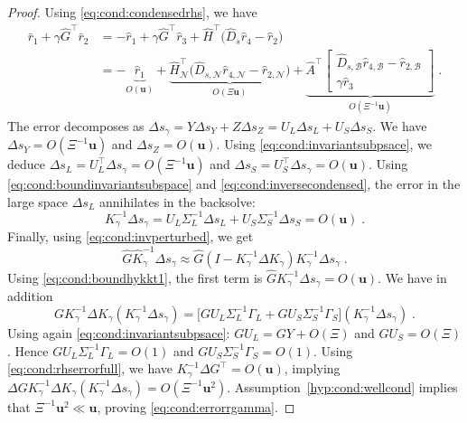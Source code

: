 \documentclass[10pt,a4paper]{amsart}
\newcommand{\cactive}{\mathcal{B}}
\newcommand{\cinactive}{\mathcal{N}}
\newcommand{\epstol}{\mathbf{u}}
\begin{document}
\begin{proof}
Using \eqref{eq:cond:condensedrhs}, we have
\begin{equation*}
  \label{eq:cond:boundderivationhykkt}
  \begin{aligned}
  \bar{r}_1 + \gamma \widehat{G}^\top \bar{r}_2 &=
- \widehat{r}_1 + \gamma \widehat{G}^\top \widehat{r}_3+ \widehat{H}^\top\big(\widehat{D}_{s} \widehat{r}_{4} - \widehat{r}_{2} \big) \\
&=  -
\underbrace{\widehat{r}_1}_{O(\epstol)} +
\underbrace{
\widehat{H}_{\cinactive}^\top\big(\widehat{D}_{s,\cinactive} \widehat{r}_{4,\cinactive} - \widehat{r}_{2,\cinactive} \big)}_{O(\Xi \epstol)}
+ \underbrace{\widehat{A}^\top \begin{bmatrix}
  \widehat{D}_{s,\cactive} \widehat{r}_{4,\cactive} - \widehat{r}_{2,\cactive}  \\
  \gamma \widehat{r}_3
\end{bmatrix}}_{O(\Xi^{-1}\epstol)} \; .
  \end{aligned}
\end{equation*}
The error decomposes as $\Delta s_\gamma = Y \Delta s_Y  + Z \Delta s_Z
= U_L \Delta s_L + U_S \Delta s_S$.
We have $\Delta s_Y = O(\Xi^{-1} \epstol)$ and $\Delta s_Z = O(\epstol)$.
Using \eqref{eq:cond:invariantsubpsace}, we deduce
$\Delta s_L = U_L^\top \Delta s_\gamma = O(\Xi^{-1} \epstol)$ and
$\Delta s_S = U_S^\top \Delta s_\gamma = O(\epstol)$.
Using \eqref{eq:cond:boundinvariantsubspace} and \eqref{eq:cond:inversecondensed},
the error in the large space $\Delta s_L$ annihilates in the backsolve:
\begin{equation}
  \label{eq:cond:boundhykkt1}
  K_\gamma^{-1} \Delta s_\gamma = U_L \Sigma_L^{-1} \Delta s_L + U_S \Sigma_S^{-1} \Delta s_S  = O(\epstol)
  \; .
\end{equation}
Finally, using \eqref{eq:cond:invperturbed}, we get
\begin{equation}
  \widehat{G} \widehat{K}_\gamma^{-1} \Delta s_\gamma \approx
  \widehat{G} (I - K_\gamma^{-1}\Delta K_\gamma) K_\gamma^{-1} \Delta s_\gamma \; .
\end{equation}
Using \eqref{eq:cond:boundhykkt1}, the first term is $\widehat{G} K_\gamma^{-1} \Delta s_\gamma = O(\epstol)$.
We have in addition
\begin{equation}
  G K_\gamma^{-1}\Delta K_\gamma (K_\gamma^{-1} \Delta s_\gamma)  =
  \big[ G U_L \Sigma_L^{-1} \Gamma_L + G U_S \Sigma_S^{-1} \Gamma_S \big] (K_\gamma^{-1} \Delta s_\gamma) \; .
\end{equation}
Using again \eqref{eq:cond:invariantsubpsace}:
$G U_L = G Y + O(\Xi)$ and $G U_S = O(\Xi)$. Hence
$G U_L \Sigma_L^{-1} \Gamma_L = O(1)$ and $G U_S \Sigma_S^{-1} \Gamma_S = O(1)$.
Using \eqref{eq:cond:rhserrorfull}, we have $K_\gamma^{-1} \Delta G^\top = O(\epstol)$,
implying $\Delta G K_\gamma^{-1} \Delta K_\gamma (K_\gamma^{-1} \Delta s_\gamma) = O(\Xi^{-1} \epstol^{2})$.
Assumption~\ref{hyp:cond:wellcond} implies that $\Xi^{-1} \epstol^2 \ll \epstol$,
proving \eqref{eq:cond:errorrgamma}.
\end{proof}
\end{document}
